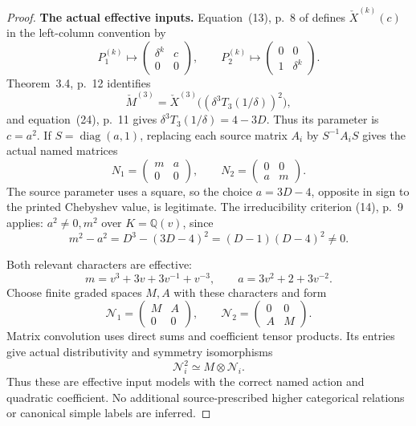\documentclass[11pt,a4paper]{article}
\newcommand{\Q}{\mathbb Q}\newcommand{\Z}{\mathbb Z}\newcommand{\C}{\mathbb C}\newcommand{\N}{\mathbb N}\newcommand{\F}{\mathbb F}
\newcommand{\A}{\mathbb A}\newcommand{\PP}{\mathbb P}\newcommand{\GL}{\mathrm{GL}}
\theoremstyle{named}\newtheorem{finding}{Finding}[section]
\theoremstyle{definition}\newtheorem{definition}[finding]{Definition}
\theoremstyle{remark}\newtheorem{remark}[finding]{Remark}
\begin{document}
\begin{proof}
\par\smallskip\noindent\textbf{The actual effective inputs.}\quad
Equation~(13), p.~8 of \cite{BlasiakChebyshev}
defines \(\check X^{(k)}(c)\) in the left-column
convention by
\[
 P_1^{(k)}\longmapsto
   \begin{pmatrix}\delta^k&c\\0&0\end{pmatrix},
 \qquad
 P_2^{(k)}\longmapsto
   \begin{pmatrix}0&0\\1&\delta^k\end{pmatrix}.
\]
Theorem~3.4, p.~12 identifies
\[
 \check M^{(3)}
 =\check X^{(3)}\bigl((\delta^3T_3(1/\delta))^2\bigr),
\]
and equation~(24), p.~11 gives
\(\delta^3T_3(1/\delta)=4-3D\).
Thus its parameter is \(c=a^2\).
If \(S=\operatorname{diag}(a,1)\), replacing
each source matrix \(A_i\) by \(S^{-1}A_iS\)
gives the actual named matrices
\begin{equation}\label{eq:sixTensorPositiveInputs}
 N_1=\begin{pmatrix}m&a\\0&0\end{pmatrix},\qquad
 N_2=\begin{pmatrix}0&0\\a&m\end{pmatrix}.
\end{equation}
The source parameter uses a square, so the
choice \(a=3D-4\), opposite in sign to the
printed Chebyshev value, is legitimate.
The irreducibility criterion (14), p.~9 applies:
\(a^2\ne0,m^2\) over \(K=\Q(v)\), since
\begin{equation}\label{eq:sixTensorSimpleFactor}
 m^2-a^2=D^3-(3D-4)^2=(D-1)(D-4)^2\ne0.
\end{equation}

Both relevant characters are effective:
\[
 m=v^3+3v+3v^{-1}+v^{-3},\qquad
 a=3v^2+2+3v^{-2}.
\]
Choose finite graded spaces \(M,A\) with these
characters and form
\[
 \mathcal N_1=\begin{pmatrix}M&A\\0&0\end{pmatrix},\qquad
 \mathcal N_2=\begin{pmatrix}0&0\\A&M\end{pmatrix}.
\]
Matrix convolution uses direct sums and coefficient
tensor products. Its entries give actual
distributivity and symmetry isomorphisms
\begin{equation}\label{eq:sixTensorInputQuadratic}
              \mathcal N_i^2\simeq M\otimes\mathcal N_i.
\end{equation}
Thus these are effective input models with
the correct named action and quadratic coefficient.
No additional source-prescribed higher categorical
relations or canonical simple labels are inferred.


\end{proof}
\end{document}
